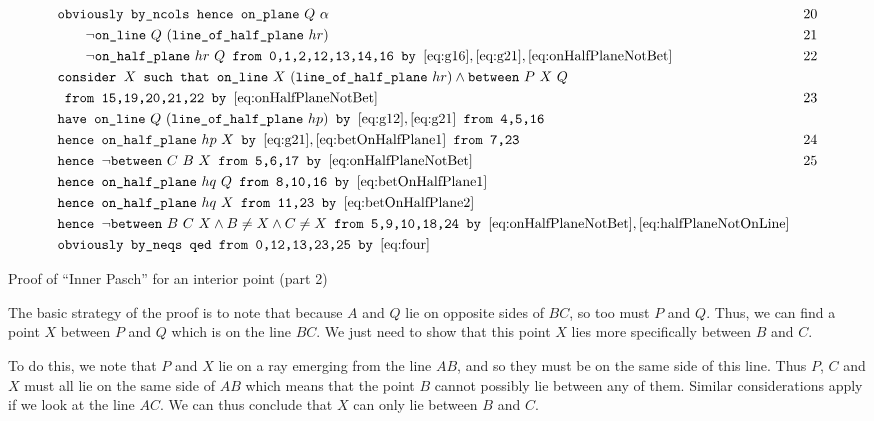 \begin{boxedfigure}
\small
\begin{align*}
&\texttt{obviously by\_ncols hence } \code{on\_plane}\ Q\ \alpha& 20\\
&\qquad\neg\code{on\_line}\ Q\ (\code{line\_of\_half\_plane}\ hr) & 21\\
&\qquad\neg\code{on\_half\_plane}\ hr\ Q \texttt{ from 0,1,2,12,13,14,16 by } \eqref{eq:g16}, \eqref{eq:g21}, \eqref{eq:onHalfPlaneNotBet}& 22\\
&\texttt{consider } X \texttt{ such that } \code{on\_line}\ X\ (\code{line\_of\_half\_plane}\ hr) \wedge \between{P}{X}{Q}\\
&\texttt{ from 15,19,20,21,22 by } \eqref{eq:onHalfPlaneNotBet} & 23 \\
&\texttt{have } \code{on\_line}\ Q\ (\code{line\_of\_half\_plane}\ hp)\texttt{ by } \eqref{eq:g12}, \eqref{eq:g21} \texttt{ from 4,5,16}\\
&\texttt{hence } \code{on\_half\_plane}\ hp\ X\texttt{ by } \eqref{eq:g21}, \eqref{eq:betOnHalfPlane1} \texttt{ from 7,23} & 24\\
&\texttt{hence } \neg\between{C}{B}{X} \texttt{ from 5,6,17 by } \eqref{eq:onHalfPlaneNotBet} & 25\\
&\texttt{hence } \code{on\_half\_plane}\ hq\ Q \texttt{ from 8,10,16 by } \eqref{eq:betOnHalfPlane1}\\
&\texttt{hence } \code{on\_half\_plane}\ hq\ X \texttt{ from 11,23 by } \eqref{eq:betOnHalfPlane2}\\
&\texttt{hence } \neg\between{B}{C}{X} \wedge B \neq X \wedge C \neq X\texttt{ from 5,9,10,18,24 by } \eqref{eq:onHalfPlaneNotBet}, \eqref{eq:halfPlaneNotOnLine}\\
&\texttt{obviously by\_neqs qed from 0,12,13,23,25 by } \eqref{eq:four}
\end{align*}
\caption{Proof of ``Inner Pasch'' for an interior point (part 2)}
\label{fig:tricut12}
\end{boxedfigure}

The basic strategy of the proof is to note that because $A$ and $Q$ lie on opposite sides of $BC$, so too must $P$ and $Q$. Thus, we can find a point $X$ between $P$ and $Q$ which is on the line $BC$. We just need to show that this point $X$ lies more specifically between $B$ and $C$.

To do this, we note that $P$ and $X$ lie on a ray emerging from the line $AB$, and so they must be on the same side of this line. Thus $P$, $C$ and $X$ must all lie on the same side of $AB$ which means that the point $B$ cannot possibly lie between any of them. Similar considerations apply if we look at the line $AC$. We can thus conclude that $X$ can only lie between $B$ and $C$.

